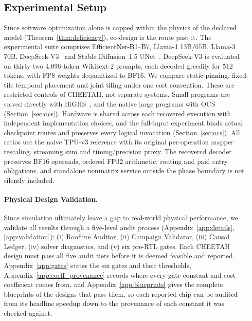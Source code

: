 \subsection{Experimental Setup}
\label{sec:exp_intro}
Since software optimization alone is capped within the physics of the declared model (Theorem~\ref{thm:deficiency}), co-design is the route past it.
The experimental suite comprises EfficientNet-B1--B7, Llama-1 13B/65B, Llama-3 70B, DeepSeek-V3~\citep{tan2019efficientnet,llama3modelcard,deepseekv3report} and Stable Diffusion~1.5 UNet~\citep{rombach2022ldm}.
DeepSeek-V3 is evaluated on thirty-two 4,096-token Wikitext-2 prompts, each decoded greedily for 512 tokens, with FP8 weights dequantized to BF16.
We compare static pinning, fixed-tile temporal placement and joint tiling under one cost convention.
These are restricted controls of CHEETAH, not separate systems.
Small programs are solved directly with HiGHS~\citep{huangfu2018parallel}, and the native large programs with OCS (Section~\ref{sec:ocs}).
Hardware is shared across each recovered execution with independent implementation choices, and the full-input experiment binds actual checkpoint routes and preserves every logical invocation (Section~\ref{sec:ocs}).
All ratios use the naive TPU-v3 reference with its original per-operation mapper rescaling, streaming sum and timing/precision proxy.
The recovered decoder preserves BF16 operands, ordered FP32 arithmetic, routing and paid entry obligations, and standalone nonmatrix service outside the phase boundary is not silently included.

\paragraph{Physical Design Validation.} Since simulation ultimately leave a gap to real-world physical performance, we validate all results through a five-level audit process (Appendix~\ref{app:details}, \ref{app:validation}): (i) Roofline Auditor, (ii) Campaign Validator, (iii) Causal Ledger, (iv) solver diagnostics, and (v) six pre-RTL gates.
Each CHEETAH design must pass all five audit tiers before it is deemed feasible and reported.
Appendix~\ref{app:gates} states the six gates and their thresholds, Appendix~\ref{app:coeff_provenance} records where every gate constant and cost coefficient comes from, and Appendix~\ref{app:blueprints} gives the complete blueprints of the designs that pass them, so each reported chip can be audited from its headline speedup down to the provenance of each constant it was checked against.

